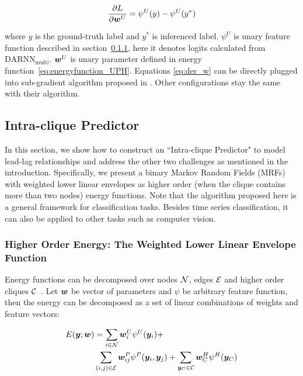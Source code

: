 \begin{align}
  \label{eq:der_w}
  \frac{\partial L}{\partial {\bm{w}}^U} = \psi^U(y)-\psi^U(y^*)
\end{align}

\noindent where $y$ is the ground-truth label and $y^*$ is
inferenced label. $\psi^U$ is unary feature
function described in section~\ref{sec:llep}, here it denotes
logits calculated from $\text{DARNN}_{\text{multi}}$. ${\bm{w}}^U$ is
unary parameter defined in energy function~\eqref{eq:energyfunction_UPH}.
Equations \eqref{eq:der_w} can be directly plugged
into sub-gradient algorithm proposed in \cite{witoonchart2017application}.
Other configurations stay the same with their algorithm.

\subsection{Intra-clique Predictor}
\label{sec:srp}

In this section, we show how to construct an ``Intra-clique
Predictor" to model lead-lag relationships and address the other
two challenges as mentioned in the introduction. Specifically, we
present a binary Markov Random Fields (MRFs) with weighted lower
linear envelopes as higher order (when the clique contains more
than two nodes) energy functions. Note that the algorithm
proposed here is a general framework for classification tasks.
Besides time series classification, it can also be applied to other tasks such as computer vision.



\subsubsection{Higher Order Energy: The Weighted Lower Linear
  Envelope Function}
\label{sec:llep}

Energy functions can be decomposed over nodes ${\mathcal{N}}$, edges ${\mathcal{E}}$
and higher order cliques $\cal C$~\cite{Szummer:ECCV08}. Let
${\bm{w}}$ be vector of parameters and $\psi$ be arbitrary feature
function, then the energy can be decomposed as a set of linear
combinations of weights and feature vectors:

\begin{align}
  \label{eq:energyfunction_UPH}
  E({\bm{y}};{\bm{w}})&=\sum_{i\in {\mathcal{N}}}{{\bm{w}}_i^U\psi^U({\bm{y}}_i)}+ \notag\\
  & \sum_{(i,j)\in {\mathcal{E}}}{{\bm{w}}_{ij}^P\psi^P({\bm{y}}_i,{\bm{y}}_j)}+
  \sum_{{\bm{y}}_C\in \cal C}{{\bm{w}}_C^H\psi^H({\bm{y}}_C)}
\end{align}

